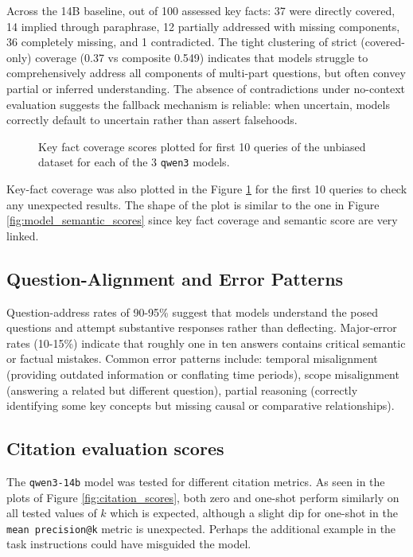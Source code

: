 \documentclass[conference]{IEEEtran}
\begin{document}
Across the 14B baseline, out of 100 assessed key facts: 37 were directly covered, 14 implied through paraphrase, 12 partially addressed with missing components, 36 completely missing, and 1 contradicted. The tight clustering of strict (covered-only) coverage (0.37 vs composite 0.549) indicates that models struggle to comprehensively address all components of multi-part questions, but often convey partial or inferred understanding. The absence of contradictions under no-context evaluation suggests the fallback mechanism is reliable: when uncertain, models correctly default to uncertain rather than assert falsehoods.

\begin{figure}
\centering

\caption{Key fact coverage scores plotted for first 10 queries of the unbiased dataset for each of the 3 \texttt{qwen3} models.}
\label{fig:model_key_fact_coverage}
\end{figure}

Key-fact coverage was also plotted in the Figure \ref{fig:model_key_fact_coverage} for the first 10 queries to check any unexpected results. The shape of the plot is similar to the one in Figure \ref{fig:model_semantic_scores} since key fact coverage and semantic score are very linked.

\subsection{Question-Alignment and Error Patterns}

Question-address rates of 90-95\% suggest that models understand the posed questions and attempt substantive responses rather than deflecting. Major-error rates (10-15\%) indicate that roughly one in ten answers contains critical semantic or factual mistakes. Common error patterns include: temporal misalignment (providing outdated information or conflating time periods), scope misalignment (answering a related but different question), partial reasoning (correctly identifying some key concepts but missing causal or comparative relationships).

\subsection{Citation evaluation scores}

The \texttt{qwen3-14b} model was tested for different citation metrics. As seen in the plots of Figure \ref{fig:citation_scores}, both zero and one-shot perform similarly on all tested values of $k$ which is expected, although a slight dip for one-shot in the \texttt{mean precision@k} metric is unexpected. Perhaps the additional example in the task instructions could have misguided the model.
\end{document}
